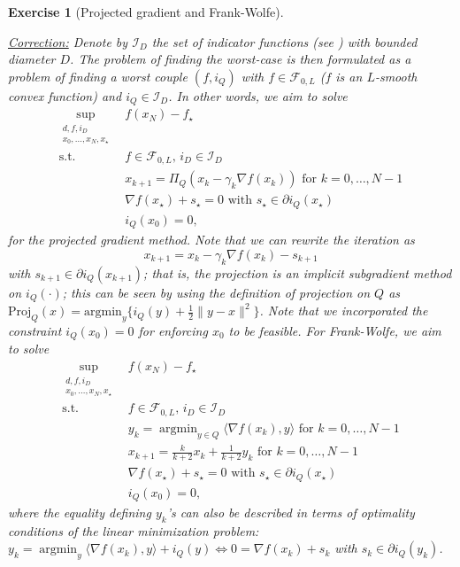 \documentclass[11pt,a4paper]{article}
\newcommand{\inner}[2]{{\langle #1, #2\rangle}}
\DeclareMathOperator*{\argmin}{argmin}
\newcommand{\correction}[1]{{{\color{blue}\underline{Correction:} #1}}}
\newcommand{\correction}[1]{}
\newtheorem{exercise}{Exercise}
\begin{document}
\begin{exercise}[Projected gradient and Frank-Wolfe]
\begin{enumerate}
	\correction{Denote by $\mathcal{I}_D$ the set of indicator functions (see \Cref{def:indicator}) with bounded diameter $D$. The problem of finding the worst-case is then formulated as a problem of finding a worst couple $(f,i_Q)$ with $f\in\mathcal{F}_{0,L}$ ($f$ is an $L$-smooth convex function) and $i_Q\in\mathcal{I}_D$. In other words, we aim to solve 
	\begin{equation}\label{ex5:proj}
	\begin{aligned}
		\sup_{\substack{d,f,i_D\\x_0,\ldots,x_{N},x_\star}} \ &f(x_N)-f_\star\\
		\text{s.t. } & f\in\mathcal{F}_{0,L},\, i_D\in\mathcal{I}_D \\
		&x_{k+1}=\Pi_Q\left(x_k-\gamma_k  \nabla f(x_k)\right) \text{ for }k=0,\ldots,N-1\\
		&\nabla f(x_\star)+s_\star=0 \text{ with }s_\star\in\partial i_Q(x_\star)\\
		&i_Q(x_0)=0,
		\end{aligned}
	\end{equation} 
for the projected gradient method. Note that we can rewrite the iteration as \[x_{k+1}=x_k-\gamma_k  \nabla f(x_k)-s_{k+1}\] with $s_{k+1}\in\partial i_Q(x_{k+1})$; that is, the projection is an implicit subgradient method on $i_Q(\cdot)$; this can be seen by using the definition of projection on $Q$ as $\mathrm{Proj}_Q(x)=\mathrm{argmin}_y \{ i_Q(y)+\tfrac12 \|y-x\|^2\}$. Note that we incorporated the constraint $i_Q(x_0)=0$ for enforcing $x_0$ to be feasible. For Frank-Wolfe, we aim to solve
	\begin{equation}\label{ex5:FW}
	\begin{aligned}
		\sup_{\substack{d,f,i_D\\x_0,\ldots,x_{N},x_\star}} \ &f(x_N)-f_\star\\
		\text{s.t. } & f\in\mathcal{F}_{0,L},\, i_D\in\mathcal{I}_D \\
		& y_k = \argmin_{y\in Q} \inner{\nabla f(x_k)}{y} \text{ for }k=0,\ldots,N-1\\
	&x_{k+1} = \tfrac{k}{k+2} x_k + \tfrac{1}{k+2} y_k \text{ for }k=0,\ldots,N-1\\
		&\nabla f(x_\star)+s_\star=0 \text{ with }s_\star\in\partial i_Q(x_\star)\\
		&i_Q(x_0)=0,
		\end{aligned}
	\end{equation} 
	where the equality defining $y_k$'s can also be described in terms of optimality conditions of the linear minimization problem: $y_k = \argmin_{y} \inner{\nabla f(x_k)}{y}+i_Q(y) \Leftrightarrow 0=\nabla f(x_k)+s_k$ with $s_k\in\partial i_Q(y_k)$.
	
}
\end{enumerate}
\end{exercise}
\end{document}
